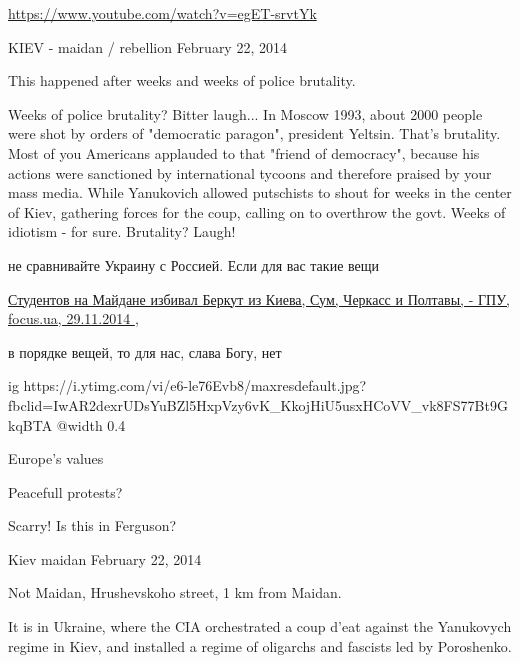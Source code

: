 
\url{https://www.youtube.com/watch?v=egET-srvtYk}

KIEV - maidan / rebellion February 22, 2014

This happened after weeks and weeks of police brutality.

\begin{itemize} %

Weeks of police brutality? Bitter laugh... In Moscow 1993, about 2000 people
were shot by orders of "democratic paragon", president Yeltsin. That's
brutality. Most of you Americans applauded to that "friend of democracy",
because his actions were sanctioned by international tycoons and therefore
praised by your mass media. While Yanukovich allowed putschists to shout for
weeks in the center of Kiev, gathering forces for the coup, calling on to
overthrow the govt. Weeks of idiotism - for sure. Brutality? Laugh!


не сравнивайте Украину с Россией. Если для вас такие вещи

\href{http://focus.ua/country/320908/}{
Студентов на Майдане избивал Беркут из Киева, Сум, Черкасс и Полтавы, - ГПУ, focus.ua, 29.11.2014%
},

в порядке вещей, то для нас, слава Богу, нет

\ifcmt
  ig https://i.ytimg.com/vi/e6-le76Evb8/maxresdefault.jpg?fbclid=IwAR2dexrUDsYuBZl5HxpVzy6vK_KkojHiU5usxHCoVV_vk8FS77Bt9GkqBTA
  @width 0.4
\fi

\end{itemize} %

Europe's values

Peacefull protests?

Scarry! Is this in Ferguson?

\begin{itemize} %
Kiev maidan February 22, 2014

Not Maidan, Hrushevskoho street, 1 km from Maidan.


It is in Ukraine, where the CIA orchestrated a coup d'eat against the
Yanukovych regime in Kiev, and installed a regime of oligarchs and fascists led
by Poroshenko.

\end{itemize} %
